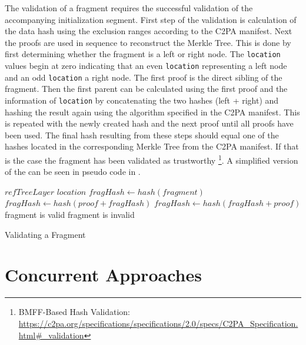 The validation of a fragment requires the successful validation of the accompanying initialization segment. First step of the validation is calculation of the data hash using the exclusion ranges according to the C2PA manifest. Next the proofs are used in sequence to reconstruct the Merkle Tree. This is done by first determining whether the fragment is a left or right node. The \texttt{location} values begin at zero indicating that an even \texttt{location} representing a left node and an odd \texttt{location} a right node. The first proof is the direct sibling of the fragment. Then the first parent can be calculated using the first proof and the information of \texttt{location} by concatenating the two hashes (left + right) and hashing the result again using the algorithm specified in the C2PA manifest. This is repeated with the newly created hash and the next proof until all proofs have been used. The final hash resulting from these steps should equal one of the hashes located in the corresponding Merkle Tree from the C2PA manifest. If that is the case the fragment has been validated as trustworthy \footnote{BMFF-Based Hash Validation: \url{https://c2pa.org/specifications/specifications/2.0/specs/C2PA_Specification.html\#_validation}}. A simplified version of the can be seen in pseudo code in .

\begin{algorithm}[H]
    \begin{algorithmic}[1]
        \Require $refTreeLayer$ 
        \Require $location$ 
        \State $fragHash \gets hash(fragment)$
                \State $fragHash \gets hash(proof + fragHash)$
            \Else
                \State $fragHash \gets hash(fragHash + proof)$
            \EndIf
        \EndFor
            \State fragment is valid
        \Else
            \State fragment is invalid
        \EndIf
    \end{algorithmic}
    \caption{Validating a Fragment}
    \label{alg:validate}
\end{algorithm}

\section{Concurrent Approaches}

